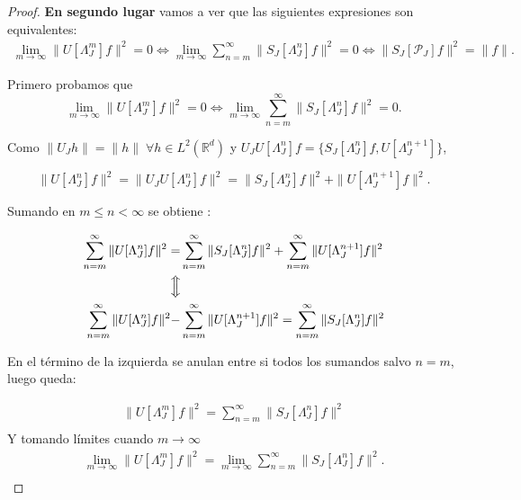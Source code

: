 \begin{proof}
  \medskip

  \noindent \textbf{En segundo lugar} vamos a ver que las siguientes expresiones son equivalentes: 
  \begin{align*}
    \lim_{m\rightarrow \infty} \|U[\Lambda_J^m]f\|^2=0 \iff \lim_{m\rightarrow\infty} \sum_{n=m}^{\infty} \|S_J[\Lambda_J^n]f\|^2=0 \iff \|S_J[\mathcal{P}_J]f\|^2 = \|f\|.
  \end{align*}

  \noindent Primero probamos que 
  $$\lim_{m\rightarrow \infty} \|U[\Lambda_J^m]f\|^2=0 \iff \lim_{m\rightarrow\infty} \sum_{n=m}^{\infty} \|S_J[\Lambda_J^n]f\|^2=0.$$
  
  \noindent Como $\|U_J h\|=\|h\| \; \forall h \in L^2(\mathbb{R}^d)$ y $U_J U[\Lambda_J^n]f=\lbrace S_J[\Lambda_J^n]f,U[\Lambda_J^{n+1}]\rbrace$,

 \begin{equation} \label{eq::1.8}
  \|U[\Lambda_J^n]f\|^2=\|U_JU[\Lambda_J^n]f\|^2=\|S_J[\Lambda_J^n]f\|^2+\|U[\Lambda_J^{n+1}]f\|^2. 
 \end{equation}

  \noindent Sumando en $m\leq n < \infty$ se obtiene : 
  
  \begin{align*}
    \sum_{n=m}^\infty \|U[\Lambda_J^n]f\|^2=&\sum_{n=m}^\infty \|S_J[\Lambda_J^n]f\|^2 + \sum_{n=m}^\infty\|U[\Lambda_J^{n+1}]f\|^2 \\
    \Big\Updownarrow \\
    \sum_{n=m}^\infty \|U[\Lambda_J^n]f\|^2 -& \sum_{n=m}^\infty\|U[\Lambda_J^{n+1}]f\|^2 =\sum_{n=m}^\infty \|S_J[\Lambda_J^n]f\|^2  \\
  \end{align*}
  
  \noindent En el término de la izquierda se anulan entre si todos los sumandos salvo $n=m$, luego queda: 

  \begin{align*}
    \|U[\Lambda_J^m]f\|^2 =\sum_{n=m}^\infty \|S_J[\Lambda_J^n]f\|^2  \\
  \end{align*}
  \noindent Y tomando límites cuando $m\rightarrow \infty$
  \begin{align*}
    \lim_{m\rightarrow \infty}\|U[\Lambda_J^m]f\|^2 =\lim_{m\rightarrow \infty}\sum_{n=m}^\infty \|S_J[\Lambda_J^n]f\|^2.  \\
  \end{align*}

  \medskip


\end{proof}
